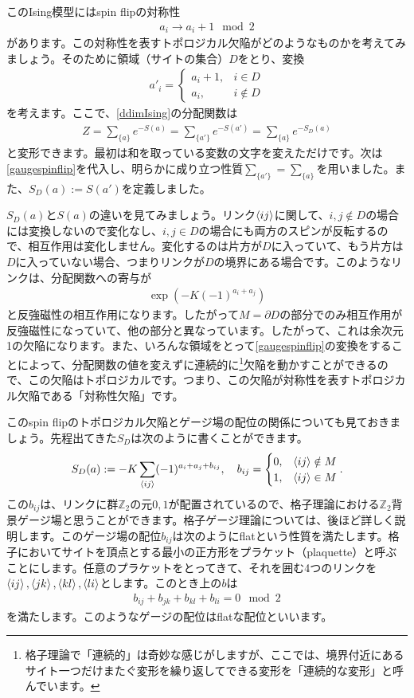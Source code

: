 \documentclass[report,paper=a4, fontsize=12pt, line_length=16cm, number_of_lines=33,dvipdfmx]{jlreq}
\numberwithin{equation}{chapter}
\newcommand{\del}{\partial}
\newcommand{\Zb}{\mathbb{Z}}
\newcommand{\link}[1]{\expval{#1}}
\begin{document}
このIsing模型にはspin flipの対称性
\begin{align}
  a_i \to a_i+1 \mod{2}
\end{align}
があります。この対称性を表すトポロジカル欠陥がどのようなものかを考えてみましょう。そのために領域（サイトの集合）$D$をとり、変換
\begin{align}
  a'_i=
  \begin{cases}
    a_i+1,& i\in D\\
    a_i,& i \notin D
  \end{cases}
  \label{gaugespinflip}
\end{align}
を考えます。ここで、\eqref{ddimIsing}の分配関数は
\begin{align}
  Z=\sum_{\{a\}}e^{-S(a)}=\sum_{\{a'\}}e^{-S(a')}=\sum_{\{a\}}e^{-S_{D}(a)}
\end{align}
と変形できます。最初は和を取っている変数の文字を変えただけです。次は\eqref{gaugespinflip}を代入し、明らかに成り立つ性質$\sum_{\{a'\}}=\sum_{\{a\}}$を用いました。また、$S_{D}(a):=S(a')$を定義しました。

$S_{D}(a)$と$S(a)$の違いを見てみましょう。リンク$\link{ij}$に関して、$i,j\notin D$の場合には変換しないので変化なし、$i,j\in D$の場合にも両方のスピンが反転するので、相互作用は変化しません。変化するのは片方が$D$に入っていて、もう片方は$D$に入っていない場合、つまりリンクが$D$の境界にある場合です。このようなリンクは、分配関数への寄与が
\begin{align}
  \exp\left(-K(-1)^{a_i+a_j}\right)
\end{align}
と反強磁性の相互作用になります。したがって$M=\del D$の部分でのみ相互作用が反強磁性になっていて、他の部分と異なっています。したがって、これは余次元1の欠陥になります。また、いろんな領域をとって\eqref{gaugespinflip}の変換をすることによって、分配関数の値を変えずに連続的に\footnote{格子理論で「連続的」は奇妙な感じがしますが、ここでは、境界付近にあるサイト一つだけまたぐ変形を繰り返してできる変形を「連続的な変形」と呼んでいます。}欠陥を動かすことができるので、この欠陥はトポロジカルです。つまり、この欠陥が対称性を表すトポロジカル欠陥である「対称性欠陥」です。

このspin flipのトポロジカル欠陥とゲージ場の配位の関係についても見ておきましょう。先程出てきた$S_{D}$は次のように書くことができます。
\begin{align}
  S_{D}(a):=-K\sum_{\link{ij}}(-1)^{a_i+a_j+b_{ij}},\quad
  b_{ij}=\begin{cases}
    0, & \link{ij}\notin M\\
    1, & \link{ij} \in M
  \end{cases}.
\end{align}
この$b_{ij}$は、リンクに群$\Zb_2$の元$0,1$が配置されているので、格子理論における$\Zb_2$背景ゲージ場と思うことができます。格子ゲージ理論については、後ほど詳しく説明します。このゲージ場の配位$b_{ij}$は次のようにflatという性質を満たします。格子においてサイトを頂点とする最小の正方形をプラケット（plaquette）と呼ぶことにします。任意のプラケットをとってきて、それを囲む4つのリンクを$\link{ij},\link{jk},\link{kl},\link{li}$とします。このとき上の$b$は
\begin{align}
  b_{ij}+b_{jk}+b_{kl}+b_{li}=0 \mod{2}
\end{align}
を満たします。このようなゲージの配位はflatな配位といいます。
\end{document}
